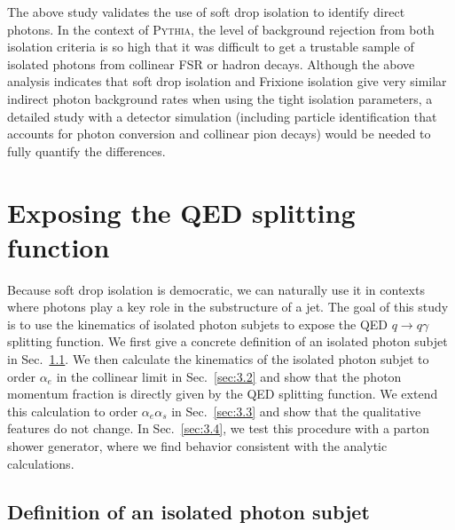 \documentclass[a4paper,11pt]{article}
\DeclareRobustCommand{\Sec}[1]{Sec.~\ref{#1}}
\begin{document}
The above study validates the use of soft drop isolation to identify direct photons.
%
In the context of \textsc{Pythia}, the level of background rejection from both isolation criteria is so high that it was difficult to get a trustable sample of isolated photons from collinear FSR or hadron decays.
%
Although the above analysis indicates that soft drop isolation and Frixione isolation give very similar indirect photon background rates when using the tight isolation parameters, a detailed study with a detector simulation (including particle identification that accounts for photon conversion and collinear pion decays) would be needed to fully quantify the differences.


\section{Exposing the QED splitting function}
\label{sec:3}

Because soft drop isolation is democratic, we can naturally use it in contexts where photons play a key role in the substructure of a jet.
%
The goal of this study is to use the kinematics of isolated photon subjets to expose the QED $q \to q \gamma$ splitting function.
%
We first give a concrete definition of an isolated photon subjet in \Sec{sec:3.1}.
%
We then calculate the kinematics of the isolated photon subjet to order $\alpha_e$ in the collinear limit in \Sec{sec:3.2} and show that the photon momentum fraction is directly given by the QED splitting function.
%
We extend this calculation to order $\alpha_e \alpha_s$ in \Sec{sec:3.3} and show that the qualitative features do not change.
%
In \Sec{sec:3.4}, we test this procedure with a parton shower generator, where we find behavior consistent with the analytic calculations.

\subsection{Definition of an isolated photon subjet}
\label{sec:3.1}
\end{document}
